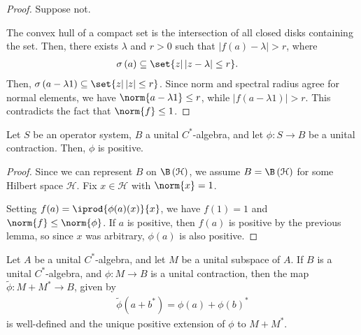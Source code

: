 \documentclass[10pt]{mypackage}
\begin{document}
\begin{proof}
  Suppose not.\newline

  The convex hull of a compact set is the intersection of all closed disks containing the set. Then, there exists $\lambda$ and $r > 0$ such that $\left\vert f(a) - \lambda \right\vert > r$, where
  \begin{align*}
    \sigma\left( a \right) &\subseteq \set{z | \left\vert z - \lambda \right\vert \leq r}.
  \end{align*}
  Then, $\sigma\left( a - \lambda 1 \right)\subseteq \set{z | \left\vert z \right\vert \leq r}$. Since norm and spectral radius agree for normal elements, we have $\norm{a - \lambda 1} \leq r$, while $\left\vert f\left( a - \lambda 1 \right) \right\vert > r$. This contradicts the fact that $\norm{f}\leq 1$.
\end{proof}
\begin{proposition}
  Let $S$ be an operator system, $B$ a unital $C^{\ast}$-algebra, and let $\phi\colon S\rightarrow B$ be a unital contraction. Then, $\phi$ is positive.
\end{proposition}
\begin{proof}
  Since we can represent $B$ on $\B\left( \mathcal{H} \right)$, we assume $B = \B\left( \mathcal{H} \right)$ for some Hilbert space $\mathcal{H}$. Fix $x\in \mathcal{H}$ with $\norm{x} = 1$.\newline

  Setting $f(a) = \iprod{\phi(a)(x)}{x}$, we have $f(1) = 1$ and $\norm{f}\leq \norm{\phi}$. If $a$ is positive, then $f(a)$ is positive by the previous lemma, so since $x$ was arbitrary, $\phi(a)$ is also positive.
\end{proof}
\begin{proposition}
  Let $A$ be a unital $C^{\ast}$-algebra, and let $M$ be a unital subspace of $A$. If $B$ is a unital $C^{\ast}$-algebra, and $\phi\colon M\rightarrow B$ is a unital contraction, then the map $ \widetilde{\phi}\colon M + M^{\ast}\rightarrow B $, given by
  \begin{align*}
    \widetilde{\phi}\left( a + b^{\ast} \right) = \phi\left( a \right) + \phi\left( b \right)^{\ast}
  \end{align*}
  is well-defined and the unique positive extension of $\phi$ to $M + M^{\ast}$.
\end{proposition}
\end{document}
